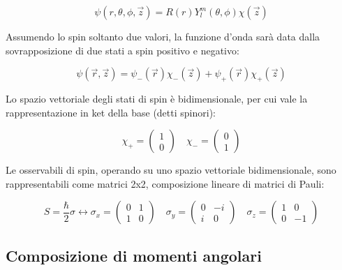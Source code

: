 \documentclass{article}
\begin{document}
\begin{equation}
    \psi(r,\theta, \phi,\vec{z})=R(r)Y^m_l(\theta, \phi) \chi(\vec{z})
\end{equation}

Assumendo lo spin soltanto due valori, la funzione d'onda sarà data dalla sovrapposizione di due stati a spin positivo e negativo:

\begin{equation}
    \psi(\vec{r},\vec{z})=\psi_-(\vec{r})\chi_-(\vec{z}) + \psi_+(\vec{r})\chi_+(\vec{z})
\end{equation}

Lo spazio vettoriale degli stati di spin è bidimensionale, per cui vale la rappresentazione in ket della base (detti spinori):

\begin{equation}
    \chi_+=\begin{pmatrix}
        1 \\
        0
    \end{pmatrix}
    \quad
    \chi_-=\begin{pmatrix}
        0 \\
        1
    \end{pmatrix}
\end{equation}

Le osservabili di spin, operando su uno spazio vettoriale bidimensionale, sono rappresentabili come matrici 2x2, composizione lineare di matrici di Pauli:

\begin{equation}
    S=\frac{\hbar}{2}\sigma \leftrightarrow
    \sigma_x=\begin{pmatrix}
        0 & 1 \\
        1 & 0
    \end{pmatrix}
    \quad
    \sigma_y=\begin{pmatrix}
        0 & -i \\
        i & 0
    \end{pmatrix}
    \quad
    \sigma_z=\begin{pmatrix}
        1 & 0  \\
        0 & -1
    \end{pmatrix}
\end{equation}

\subsection{Composizione di momenti angolari}
\end{document}
